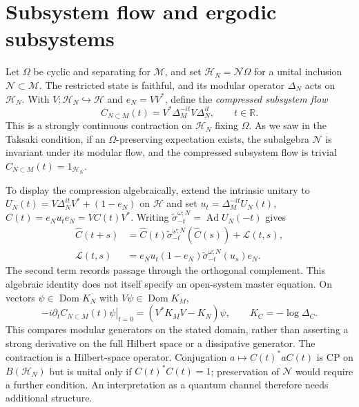 \documentclass[a4paper,11pt]{article}
\theoremstyle{definition}
\newcommand{\nn}{\nonumber}
\newcommand{\mN}{\mathcal{N}}
\begin{document}
\section{Subsystem flow and ergodic subsystems}







Let $\Omega$ be cyclic and separating for $\mathcal M$, and set
$\mathcal H_N=\overline{\mathcal N\Omega}$ for a unital inclusion $\mathcal N\subset\mathcal M$.
The restricted state is faithful, and its modular operator $\Delta_N$ acts on
$\mathcal H_N$. With $V:\mathcal H_N\hookrightarrow\mathcal H$ and $e_N=VV^*$, 
define the {\it compressed subsystem flow}
\begin{equation}
 C_{N\subset M}(t)=V^*\Delta_M^{-it}V\Delta_N^{it},
 \qquad t\in\mathbb R.
\end{equation}
This is a strongly continuous contraction on $\mathcal H_N$ fixing $\Omega$. As we saw in the Taksaki condition, if an $\Omega$-preserving expectation exists, the subalgebra $\mN$ is invariant under its modular flow, and the compressed subsystem flow is trivial
$C_{N\subset M}(t)=1_{\mathcal H_N}$.

To display the compression algebraically, extend the intrinsic unitary to
$U_N(t)=V\Delta_N^{it}V^*+(1-e_N)$ on $\mathcal H$ and set
$u_t=\Delta_M^{-it}U_N(t)$, $\widehat C(t)=e_Nu_te_N=VC(t)V^*$.
Writing $\widetilde\sigma^{\omega;N}_{-t}=\operatorname{Ad}U_N(-t)$ gives
\begin{align}
 \widehat C(t+s)&=\widehat C(t)\widetilde\sigma^{\omega;N}_{-t}(\widehat C(s))
                  +\mathcal L(t,s),\nn\\
 \mathcal L(t,s)&=e_Nu_t(1-e_N)\widetilde\sigma^{\omega;N}_{-t}(u_s)e_N.
\end{align}
The second term records passage through the orthogonal complement. This algebraic
identity does not itself specify an open-system master equation.
On vectors $\psi\in\operatorname{Dom}K_N$ with $V\psi\in\operatorname{Dom}K_M$,
\begin{equation}
 -i\left.\partial_t C_{N\subset M}(t)\psi\right|_{t=0}
 =(V^*K_MV-K_N)\psi,\qquad K_C=-\log\Delta_C.
\end{equation}
This compares modular generators on the stated domain, rather than asserting
a strong derivative on the full Hilbert space or a dissipative generator.
The contraction is a Hilbert-space operator. Conjugation
$a\mapsto C(t)^*aC(t)$ is CP on $B(\mathcal H_N)$ but is unital only if
$C(t)^*C(t)=1$; preservation of $\mathcal N$ would require a further condition.
An interpretation as a quantum channel therefore needs additional structure.
\end{document}
